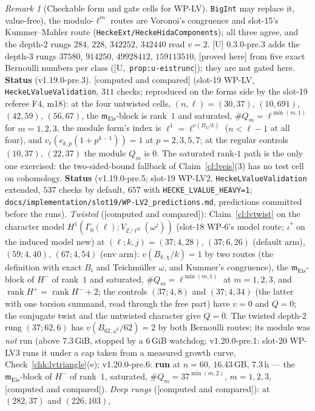 \documentclass[11pt]{article}
\theoremstyle{remark}
\newtheorem{remark}[theorem]{Remark}
\newcommand{\Z}{\mathbb{Z}}
\newcommand{\Ga}{\Gamma}
\DeclareMathOperator{\rank}{rank}
\newcommand{\m}{\mathfrak{m}}
\newcommand{\PROVED}{\textsf{[proved here]}}
\newcommand{\CMPD}{\textsf{[computed and compared]}}   %
\newcommand{\Ucite}[1]{[U,~\texttt{#1}]}               %
\begin{document}
\begin{remark}[Checkable form and gate cells for WP-LV]
\texttt{BigInt} may replace it, value-free), the modulo-$\ell^{m}$ routes are Voronoi's congruence and slot-15's Kummer--Mahler route
(\texttt{HeckeExt/HeckeHidaComponents}); all three agree, and the depth-$2$ rungs $284$, $228$, $342252$, $342440$ read $v=2$. [U] 0.3.0-pre.3 adds the depth-$3$ rungs
$37580$, $914250$, $49928412$, $159113510$, \PROVED{} from five exact Bernoulli numbers per class (\Ucite{prop:u-eistrunc}); they are not gated here.
\textbf{Status} (v1.19.0-pre.3). \CMPD{} (slot-19 WP-LV, \texttt{HeckeLValueValidation}, $311$ checks; reproduced on the forms side by the slot-19 referee F4, m18): at
the four untwisted cells, $(n,\ell)=(30,37)$, $(10,691)$, $(42,59)$, $(56,67)$, the $\m_{\mathrm{Eis}}$-block is rank~$1$ and saturated, $\#Q_m=\ell^{\min(m,1)}$ for
$m=1,2,3$, the module form's index is $\ell^{1}=\ell^{v(B_k/k)}$ ($n<\ell-1$ at all four), and $v_\ell(c_{k,p}(1+p^{k-1}))=1$ at $p=2,3,5,7$; at the regular controls
$(10,37)$, $(22,37)$ the module $Q_m$ is $0$. The saturated rank-$1$ path is the only one exercised: the two-sided-bound fallback of Claim~\ref{cl:lveis}(3) has no
test cell on cohomology.
\textbf{Status} (v1.19.0-pre.5; slot-19 WP-LV2, \texttt{HeckeLValueValidation} extended, $537$ checks by default, $657$ with \texttt{HECKE\_LVALUE\_HEAVY=1};
\texttt{docs/implementation/slot19/WP-LV2\_predictions.md}, predictions committed before the runs). \emph{Twisted} (\CMPD): Claim~\ref{cl:lvtwist} on the character model
$H^{1}(\Ga_0(\ell);V_{\Z/\ell^{K}}(\omega^{j}))$ (slot-18 WP-6's model route; $\iota^{\ast}$ on the induced model new) at $(\ell;k,j)=(37;4,28)$, $(37;6,26)$ (default arm), $(59;4,40)$,
$(67;4,54)$ (env arm): $v(B_{k,\chi}/k)=1$ by two routes (the definition with exact $B_i$ and Teichm\"uller $\omega$, and Kummer's congruence), the $\m_{\mathrm{Eis}}$-block of
$H^{-}$ of rank~$1$ and saturated, $\#Q_m=\ell^{\min(m,1)}$ at $m=1,2,3$, and $\rank H^{+}=\rank H^{-}+2$; the controls $(37;4,8)$ and $(37;4,34)$ (the latter with one torsion summand,
read through the free part) have $v=0$ and $Q=0$; the conjugate twist and the untwisted character give $Q=0$. The twisted depth-$2$ rung $(37;62,6)$ has $v(B_{62,\omega^{6}}/62)=2$
by both Bernoulli routes; its module was \emph{not} run (above $7.3$\,GiB, stopped by a $6$\,GiB watchdog; v1.20.0-pre.1: slot-20 WP-LV3 runs it under a cap taken from a measured growth curve,
Check~\ref{chk:lvtriangle}(e); v1.20.0-pre.6: \textbf{run} at $n=60$, $16.43$\,GB, $7.3$\,h --- the $\m_{\mathrm{Eis}}$-block of $H^{-}$ of rank~$1$, saturated, $\#Q_m=37^{\min(m,2)}$, $m=1,2,3$, \CMPD). \emph{Deep rungs} (\CMPD): at $(282,37)$ and $(226,103)$,

\end{remark}
\end{document}
